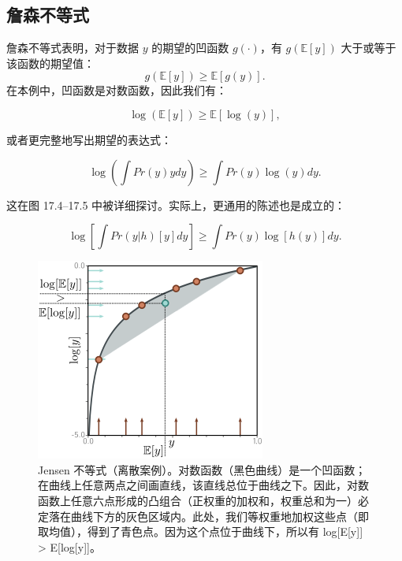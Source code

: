 \subsection{詹森不等式}

詹森不等式表明，对于数据 \(y\) 的期望的凹函数 \(g(\cdot)\)，有 \(g(\mathbb{E}[y])\) 大于或等于该函数的期望值：
\begin{equation}
g(\mathbb{E}[y]) \geq \mathbb{E}[g(y)]. 
\end{equation}
在本例中，凹函数是对数函数，因此我们有：

\begin{equation}
\log(\mathbb{E}[y]) \geq \mathbb{E}[\log(y)], 
\end{equation}

或者更完整地写出期望的表达式：

\begin{equation}
\log \left( \int Pr(y)ydy \right) \geq \int Pr(y)\log(y)dy. 
\end{equation}

这在图 17.4–17.5 中被详细探讨。实际上，更通用的陈述也是成立的：

\begin{equation}
\log \left[ \int Pr(y|h)[y] dy \right] \geq \int Pr(y) \log[h(y)]dy. 
\end{equation}


\begin{figure}[ht!]
\centering
\includegraphics[width=0.7\linewidth]{png/chapter17/VAEJensenUnder.png}
\caption{Jensen 不等式（离散案例）。对数函数（黑色曲线）是一个凹函数；在曲线上任意两点之间画直线，该直线总位于曲线之下。因此，对数函数上任意六点形成的凸组合（正权重的加权和，权重总和为一）必定落在曲线下方的灰色区域内。此处，我们等权重地加权这些点（即取均值），得到了青色点。因为这个点位于曲线下，所以有 log[E[y]] > E[log[y]]。}
\end{figure}


